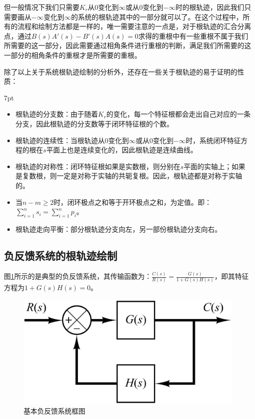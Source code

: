 \documentclass{article}
\numberwithin{equation}{section}
\numberwithin{figure}{section}
\newenvironment{formal}{%
\def\FrameCommand{%
\hspace{1pt}%
{\color{DarkBlue}\vrule width 2pt}%
{\color{formalshade}\vrule width 4pt}%
\colorbox{formalshade}%
}%
\MakeFramed{\advance\hsize-\width\FrameRestore}%
\noindent\hspace{-4.55pt}%
\begin{adjustwidth}{}{7pt}%
\vspace{2pt}\vspace{2pt}%
}
{%
\vspace{2pt}\end{adjustwidth}\endMakeFramed%
}
\begin{document}
但一般情况下我们只需要$K_r$从$0$变化到$\infty$或从$0$变化到$-\infty$时的根轨迹，因此我们只需要画从$-\infty$变化到$\infty$的系统的根轨迹其中的一部分就可以了。在这个过程中，所有的流程和绘制方法都是一样的，唯一需要注意的一点是，对于根轨迹的汇合分离点，通过$B(s)A'(s)-B'(s)A(s)=0$求得的重根中有一些重根不属于我们所需要的这一部分，因此需要通过相角条件进行重根的判断，满足我们所需要的这一部分的相角条件的重根才是所需要的重根。

除了以上关于系统根轨迹绘制的分析外，还存在一些关于根轨迹的易于证明的性质：
\begin{formal}
    \begin{itemize}
        \item 根轨迹的分支数：由于随着$K_r$的变化，每一个特征根都会走出自己对应的一条分支，因此根轨迹的分支数等于闭环特征根的个数。
        \item 根轨迹的连续性：当根轨迹从$0$变化到$\infty$或从$0$变化到$-\infty$时，系统闭环特征方程的根在$s$平面上也是连续变化的，因此根轨迹是连续曲线。
        \item 根轨迹的对称性：闭环特征根如果是实数根，则分别在$s$平面的实轴上；如果是复数根，则一定是对称于实轴的共轭复根。因此，根轨迹都是对称于实轴的。
        \item 当$n-m≥2$时，闭环极点之和等于开环极点之和，为定值。即：$\sum_{i=1}^{n}s_i=\sum_{i=1}^{n}p_i$。
        \item 根轨迹走向平衡：部分根轨迹分支向左，另一部份根轨迹分支向右。
    \end{itemize}
\end{formal}

\subsection{负反馈系统的根轨迹绘制}

图\ref{NegativeFeedbackSystem}所示的是典型的负反馈系统，其传输函数为：$\frac{C(s)}{R(s)}=\frac{G(s)}{1+G(s)H(s)}$，即其特征方程为$1+G(s)H(s)=0$。

\begin{figure}
    \centering
    \includegraphics[width=.4\textwidth]{Chapter6/NegativeFeedbackSystem.png} %
    \caption{基本负反馈系统框图} %
    \label{NegativeFeedbackSystem} %
\end{figure}
\end{document}
